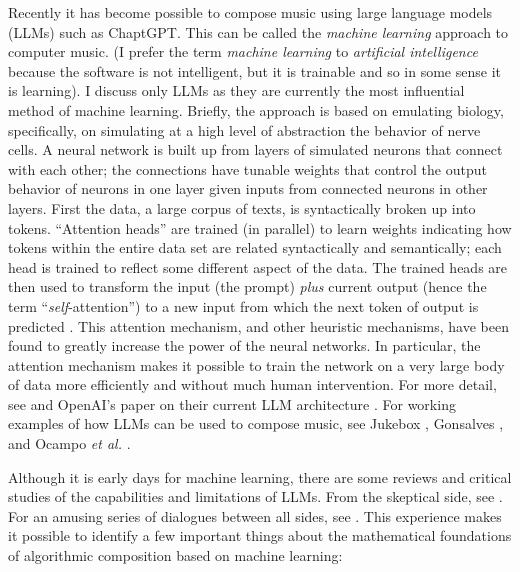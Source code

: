 \documentclass[11pt,papersize=a4]{scrartcl}
\begin{document}
Recently it has become possible to compose music using large language models (LLMs) such as ChaptGPT. This can be called the \emph{machine learning} approach to computer music. (I prefer the term \emph{machine learning} to \emph{artificial intelligence} because the software is not intelligent, but it is trainable and so in some sense it is learning). I discuss only LLMs as they are currently the most influential method of machine learning. Briefly, the approach is based on emulating biology, specifically, on simulating at a high level of abstraction the behavior of nerve cells. A neural network is built up from layers of simulated neurons that connect with each other; the connections have tunable weights that control the output behavior of neurons in one layer given inputs from connected neurons in other layers. First the data, a large corpus of texts, is syntactically broken up into tokens. ``Attention heads'' are trained (in parallel) to learn weights indicating how tokens within the entire data set are related syntactically and semantically; each head is trained to reflect some different aspect of the data. The trained heads are then used to transform the input (the prompt) \emph{plus} current output (hence the term ``\emph{self}-attention'') to a new input from which the next token of output is predicted \parencite{vaswani2017attention}. This attention mechanism, and other heuristic mechanisms, have been found to greatly increase the power of the neural networks. In particular, the attention mechanism makes it possible to train the network on a very large body of data more efficiently and without much human intervention. For more detail, see \parencite{zhang2023complete} and OpenAI's paper on their current LLM architecture \parencite{openai2023gpt4}. For working examples of how LLMs can be used to compose music, see Jukebox \parencite{openai2023jukebox}, Gonsalves \parencite{aitunes}, and Ocampo \emph{et al.} \parencite{ocampo2023using}.

Although it is early days for machine learning, there are some reviews and critical studies of the capabilities and limitations of LLMs. From the skeptical side, see \parencite{dale2021gpt}. For an amusing series of dialogues between all sides, see \parencite{shtetl}. This experience makes it possible to identify a few important things about the mathematical foundations of algorithmic composition based on machine learning:
\end{document}
